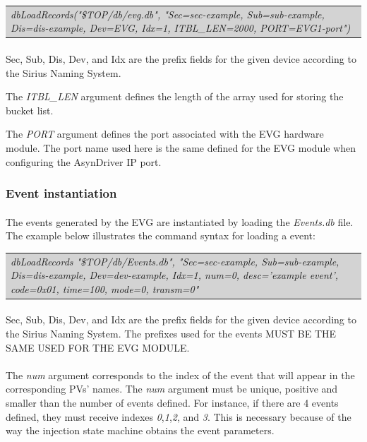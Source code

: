 \documentclass[openany]{article}
\begin{document}
		\bigskip
		\colorbox{lightgray}{
			\begin{tabularx}{0.9\textwidth}{X}
			\emph{dbLoadRecords("\${TOP}/db/evg.db", "Sec=sec-example, Sub=sub-example, Dis=dis-example, Dev=EVG, Idx=1, ITBL\_LEN=2000, PORT=EVG1-port")}
			\end{tabularx}
		}

			\paragraph{} Sec, Sub, Dis, Dev, and Idx are the prefix fields for the given device according to the Sirius Naming System.
			\par The \emph{ITBL\_LEN} argument defines the length of the array used for storing the bucket list.
			\par The \emph{PORT} argument defines the port associated with the EVG hardware module. The port name used here is the same defined for the EVG module when configuring the AsynDriver IP port.

		\subsubsection{Event instantiation}\label{sec:event-instantiation}
		
			\paragraph{} The events generated by the EVG are instantiated by loading the \emph{Events.db} file. The example below illustrates the command syntax for loading a event:

			\bigskip
			\colorbox{lightgray}{
				\begin{tabularx}{0.9\textwidth}{X}
				\emph{dbLoadRecords "\${TOP}/db/Events.db", "Sec=sec-example, Sub=sub-example, Dis=dis-example, Dev=dev-example, Idx=1, num=0, desc='example event', code=0x01, time=100, mode=0, transm=0"}
				\end{tabularx}
			}

			\paragraph{} Sec, Sub, Dis, Dev, and Idx are the prefix fields for the given device according to the Sirius Naming System. The prefixes used for the events MUST BE THE SAME USED FOR THE EVG MODULE.
			\paragraph{} The \emph{num} argument corresponds to the index of the event that will appear in the corresponding PVs' names. The \emph{num} argument must be unique, positive and smaller than the number of events defined. For instance, if there are 4 events defined, they must receive indexes \emph{0},\emph{1},\emph{2}, and \emph{3}. This is necessary because of the way the injection state machine obtains the event parameters.
\end{document}
